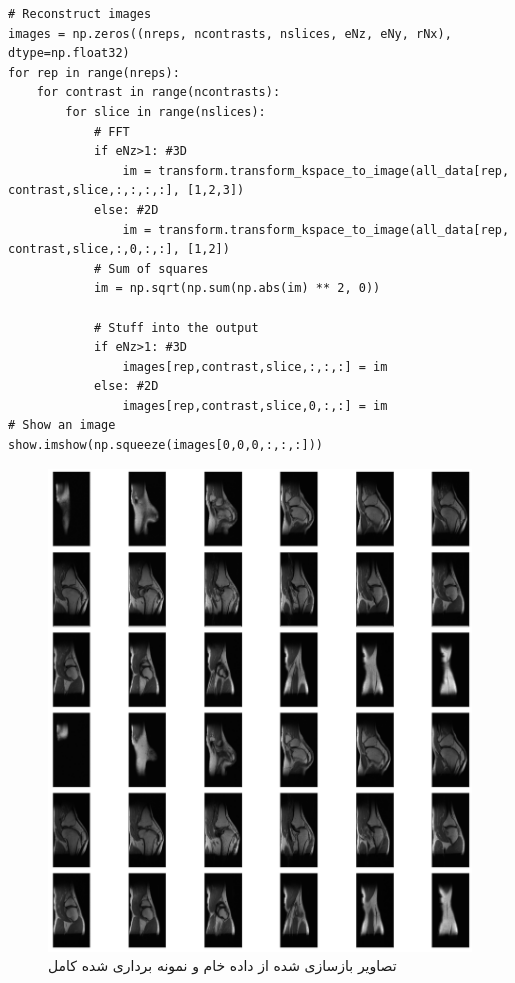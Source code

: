 \begin{latin}
\begin{lstlisting}
# Reconstruct images
images = np.zeros((nreps, ncontrasts, nslices, eNz, eNy, rNx), dtype=np.float32)
for rep in range(nreps):
	for contrast in range(ncontrasts):
		for slice in range(nslices):
			# FFT
			if eNz>1: #3D
				im = transform.transform_kspace_to_image(all_data[rep, contrast,slice,:,:,:,:], [1,2,3])
			else: #2D
				im = transform.transform_kspace_to_image(all_data[rep, contrast,slice,:,0,:,:], [1,2])
			# Sum of squares
			im = np.sqrt(np.sum(np.abs(im) ** 2, 0))
				
			# Stuff into the output
			if eNz>1: #3D
				images[rep,contrast,slice,:,:,:] = im
			else: #2D
				images[rep,contrast,slice,0,:,:] = im
# Show an image
show.imshow(np.squeeze(images[0,0,0,:,:,:]))
\end{lstlisting}
\end{latin}


\begin{figure}[t!]
	\centering
	\includegraphics[width=0.6\linewidth]{chapters/chapter-4/figs/result-36-plots-data-load}
	\caption{تصاویر بازسازی شده از داده خام و نمونه برداری شده کامل}
	\label{fig:result-36-plots-data-load}
\end{figure}


